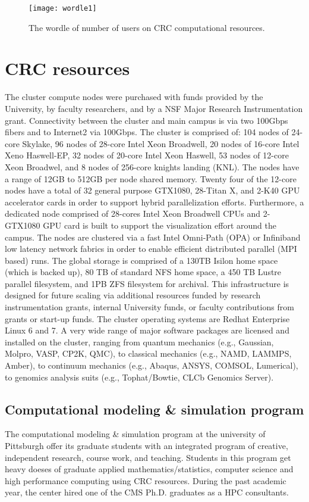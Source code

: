 \documentclass[conference]{IEEEtran}
\begin{document}
\begin{figure}
    \centering
    \texttt{[image: wordle1]}
    \caption{The wordle of number of users on CRC computational resources.}
    \label{fig:wordle1}
\end{figure}


\section{CRC resources}
The cluster compute nodes were purchased with funds provided by the University, by faculty researchers, and by a NSF Major Research Instrumentation grant. Connectivity between the cluster and main campus is via two 100Gbps fibers and to Internet2 via 100Gbps.  The cluster is comprised of: 104 nodes of 24-core Skylake, 96 nodes of 28-core Intel Xeon Broadwell, 20 nodes of 16-core Intel Xeno Haswell-EP, 32 nodes of 20-core Intel Xeon Haswell, 53 nodes of 12-core Xeon Broadwel, and 8 nodes of 256-core knights landing (KNL). The nodes
have a range of 12GB to 512GB per node shared memory. Twenty four of the 12-core nodes have a total of 32 general
purpose GTX1080, 28-Titan X, and 2-K40 GPU accelerator cards in order to support hybrid parallelization efforts. Furthermore, a dedicated node comprised of 28-cores Intel Xeon Broadwell CPUs and 2-GTX1080 GPU card is built to support the visualization effort around the campus.
The nodes
are clustered via a fast Intel Omni-Path (OPA) or Infiniband low latency network fabrics in order to enable efficient distributed parallel
(MPI based) runs. The global storage is comprised of a 130TB Isilon home space (which is backed up), 80 TB of standard NFS home space, a 450 TB Lustre parallel filesystem, and 1PB ZFS filesystem for archival. This infrastructure is designed for future scaling via additional resources funded by research instrumentation grants, internal University funds, or faculty contributions from grants or start-up funds. The cluster operating systems are Redhat Enterprise Linux 6 and 7. A very wide range of major software packages are licensed and installed on the cluster, ranging from quantum mechanics (e.g., Gaussian, Molpro, VASP, CP2K, QMC), to classical mechanics (e.g., NAMD, LAMMPS, Amber), to continuum mechanics (e.g., Abaqus, ANSYS, COMSOL, Lumerical), to genomics analysis suits (e.g., Tophat/Bowtie, CLCb Genomics Server).

\subsection{Computational modeling \& simulation program}
The computational modeling \& simulation program at the university of Pittsburgh offer its graduate students with an integrated program of creative, independent research, course work, and teaching. Students in this program get heavy doeses of graduate applied mathematics/statistics, computer science and high performance computing using CRC resources. During the past academic year, the center hired one of the CMS Ph.D. graduates as a HPC consultants.  
\end{document}
